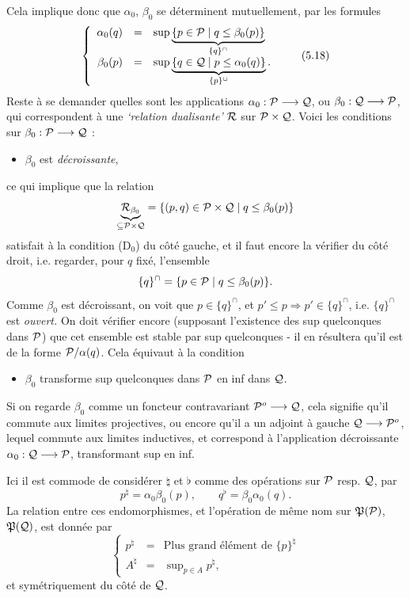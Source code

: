 Cela implique donc que $\alpha_0$, $\beta_0$ se déterminent mutuellement, par les formules
\[
\left\{
\begin{array}{rcl}
\alpha_0(q) & = & \sup \underbrace{\{p \in \cP \mid q \leq \beta_0(p)\}}_{\{q\}^{\cap}}\\[3ex]
\beta_0(p) & = & \sup \underbrace{\{q \in \cQ \mid p \leq \alpha_0(q)\}}_{\{p\}^{\cup}}.
\end{array}
\right.
\tag*{(5.18)}
\]
Reste à se demander quelles sont les applications $\alpha_0 : \mathcal{P} \longrightarrow \mathcal{Q}$, ou $\beta_0 : \mathcal{Q} \longrightarrow \mathcal{P}$, qui correspondent à une \textit{`relation dualisante'} %
$\mathcal{R}$ sur $\mathcal{P} \times \mathcal{Q}$. Voici les conditions sur $\beta_0 : \mathcal{P} \longrightarrow \mathcal{Q}$ :
\begin{itemize}[leftmargin=4em, labelsep=0.8em]
\item[\circled{a}] $\beta_0$ est \textit{décroissante},
\end{itemize}
ce qui implique que la relation
\[
\underbrace{\mathcal{R}_{\beta_0}}_{\subseteq \mathcal{P} \times \mathcal{Q}} = \{(p,q) \in \mathcal{P} \times \mathcal{Q} \mid q \leq \beta_0(p)\}
\]
satisfait à la condition (D$_0$) du côté gauche, et il faut encore la vérifier du côté droit, i.e. regarder, pour $q$ fixé, l'ensemble
\[
\{q\}^{\cap} = \{p \in \mathcal{P} \mid q \leq \beta_0(p)\}.
\]
Comme $\beta_0$ est décroissant, on voit que $p \in \{q\}^{\cap}$, et $p' \leq p \Longrightarrow p' \in \{q\}^{\cap}$, i.e. $\{q\}^{\cap}$ est \textit{ouvert.} On doit vérifier encore (supposant l'existence des sup quelconques dans $\mathcal{P}$) que cet ensemble est stable par sup quelconques - il en résultera qu'il est de la forme $\mathcal{P}/\alpha(q)$. Cela équivaut à la condition
\begin{itemize}[leftmargin=4em, labelsep=0.8em]
\item[\circled{b}] $\beta_0$ transforme sup quelconques dans $\mathcal{P}$ en inf dans $\mathcal{Q}$.
\end{itemize}
Si on regarde $\beta_0$ comme un foncteur contravariant $\mathcal{P}^{o} \longrightarrow \mathcal{Q}$, cela signifie qu'il commute aux limites projectives, ou encore qu'il a un adjoint à gauche $\mathcal{Q} \longrightarrow \mathcal{P}^{o}$, lequel commute aux limites inductives, et correspond
à l'application décroissante $\alpha_0 : \mathcal{Q} \longrightarrow \mathcal{P}$, transformant sup en inf.

Ici il est commode de considérer $\natural$ et $\flat$ comme des opérations sur $\mathcal{P}$ resp. $\mathcal{Q}$, par
\[
p^{\natural} = \alpha_0\beta_0(p), \qquad q^{\flat} = \beta_0\alpha_0(q).
\tag*{(5.19)}
\]
La relation entre ces endomorphismes, et l'opération de même nom sur $\mathfrak{P}(\mathcal{P})$, $\mathfrak{P}(\mathcal{Q})$, est donnée par
\[
\left\{
\begin{array}{rcl}
p^{\natural} & = & \text{Plus grand élément de } \{p\}^{\natural}\\[1ex]
A^{\natural} & = & \sup\nolimits_{p \in A} p^{\natural},
\end{array}
\right.
\tag*{(5.20)}
\]
et symétriquement du côté de $\mathcal{Q}$.

